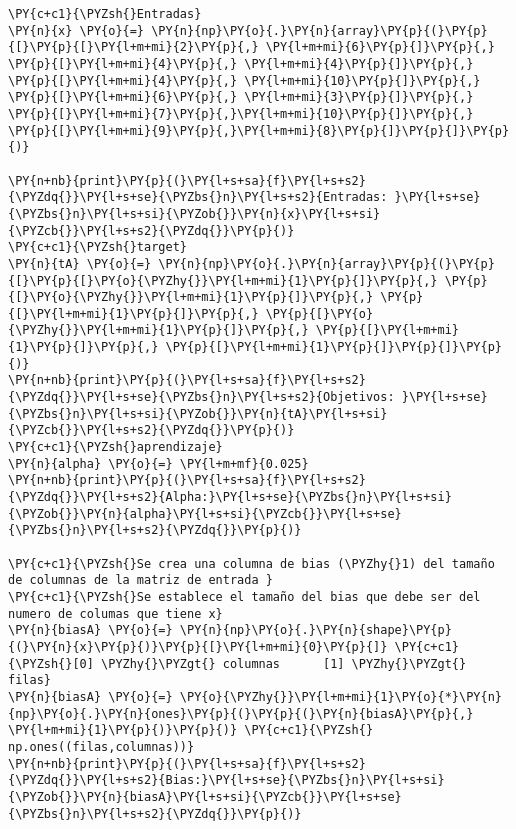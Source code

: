     \begin{tcolorbox}[breakable, size=fbox, boxrule=1pt, pad at break*=1mm,colback=cellbackground, colframe=cellborder]
\begin{Verbatim}[commandchars=\\\{\}]
\PY{c+c1}{\PYZsh{}Entradas}
\PY{n}{x} \PY{o}{=} \PY{n}{np}\PY{o}{.}\PY{n}{array}\PY{p}{(}\PY{p}{[}\PY{p}{[}\PY{l+m+mi}{2}\PY{p}{,} \PY{l+m+mi}{6}\PY{p}{]}\PY{p}{,} \PY{p}{[}\PY{l+m+mi}{4}\PY{p}{,} \PY{l+m+mi}{4}\PY{p}{]}\PY{p}{,} \PY{p}{[}\PY{l+m+mi}{4}\PY{p}{,} \PY{l+m+mi}{10}\PY{p}{]}\PY{p}{,} \PY{p}{[}\PY{l+m+mi}{6}\PY{p}{,} \PY{l+m+mi}{3}\PY{p}{]}\PY{p}{,} \PY{p}{[}\PY{l+m+mi}{7}\PY{p}{,}\PY{l+m+mi}{10}\PY{p}{]}\PY{p}{,} \PY{p}{[}\PY{l+m+mi}{9}\PY{p}{,}\PY{l+m+mi}{8}\PY{p}{]}\PY{p}{]}\PY{p}{)}

\PY{n+nb}{print}\PY{p}{(}\PY{l+s+sa}{f}\PY{l+s+s2}{\PYZdq{}}\PY{l+s+se}{\PYZbs{}n}\PY{l+s+s2}{Entradas: }\PY{l+s+se}{\PYZbs{}n}\PY{l+s+si}{\PYZob{}}\PY{n}{x}\PY{l+s+si}{\PYZcb{}}\PY{l+s+s2}{\PYZdq{}}\PY{p}{)}
\PY{c+c1}{\PYZsh{}target}
\PY{n}{tA} \PY{o}{=} \PY{n}{np}\PY{o}{.}\PY{n}{array}\PY{p}{(}\PY{p}{[}\PY{p}{[}\PY{o}{\PYZhy{}}\PY{l+m+mi}{1}\PY{p}{]}\PY{p}{,} \PY{p}{[}\PY{o}{\PYZhy{}}\PY{l+m+mi}{1}\PY{p}{]}\PY{p}{,} \PY{p}{[}\PY{l+m+mi}{1}\PY{p}{]}\PY{p}{,} \PY{p}{[}\PY{o}{\PYZhy{}}\PY{l+m+mi}{1}\PY{p}{]}\PY{p}{,} \PY{p}{[}\PY{l+m+mi}{1}\PY{p}{]}\PY{p}{,} \PY{p}{[}\PY{l+m+mi}{1}\PY{p}{]}\PY{p}{]}\PY{p}{)}
\PY{n+nb}{print}\PY{p}{(}\PY{l+s+sa}{f}\PY{l+s+s2}{\PYZdq{}}\PY{l+s+se}{\PYZbs{}n}\PY{l+s+s2}{Objetivos: }\PY{l+s+se}{\PYZbs{}n}\PY{l+s+si}{\PYZob{}}\PY{n}{tA}\PY{l+s+si}{\PYZcb{}}\PY{l+s+s2}{\PYZdq{}}\PY{p}{)}
\PY{c+c1}{\PYZsh{}aprendizaje}
\PY{n}{alpha} \PY{o}{=} \PY{l+m+mf}{0.025}
\PY{n+nb}{print}\PY{p}{(}\PY{l+s+sa}{f}\PY{l+s+s2}{\PYZdq{}}\PY{l+s+s2}{Alpha:}\PY{l+s+se}{\PYZbs{}n}\PY{l+s+si}{\PYZob{}}\PY{n}{alpha}\PY{l+s+si}{\PYZcb{}}\PY{l+s+se}{\PYZbs{}n}\PY{l+s+s2}{\PYZdq{}}\PY{p}{)}

\PY{c+c1}{\PYZsh{}Se crea una columna de bias (\PYZhy{}1) del tamaño de columnas de la matriz de entrada }
\PY{c+c1}{\PYZsh{}Se establece el tamaño del bias que debe ser del numero de columas que tiene x}
\PY{n}{biasA} \PY{o}{=} \PY{n}{np}\PY{o}{.}\PY{n}{shape}\PY{p}{(}\PY{n}{x}\PY{p}{)}\PY{p}{[}\PY{l+m+mi}{0}\PY{p}{]} \PY{c+c1}{\PYZsh{}[0] \PYZhy{}\PYZgt{} columnas      [1] \PYZhy{}\PYZgt{} filas}
\PY{n}{biasA} \PY{o}{=} \PY{o}{\PYZhy{}}\PY{l+m+mi}{1}\PY{o}{*}\PY{n}{np}\PY{o}{.}\PY{n}{ones}\PY{p}{(}\PY{p}{(}\PY{n}{biasA}\PY{p}{,} \PY{l+m+mi}{1}\PY{p}{)}\PY{p}{)} \PY{c+c1}{\PYZsh{} np.ones((filas,columnas))}
\PY{n+nb}{print}\PY{p}{(}\PY{l+s+sa}{f}\PY{l+s+s2}{\PYZdq{}}\PY{l+s+s2}{Bias:}\PY{l+s+se}{\PYZbs{}n}\PY{l+s+si}{\PYZob{}}\PY{n}{biasA}\PY{l+s+si}{\PYZcb{}}\PY{l+s+se}{\PYZbs{}n}\PY{l+s+s2}{\PYZdq{}}\PY{p}{)}


\end{Verbatim}
\end{tcolorbox}
